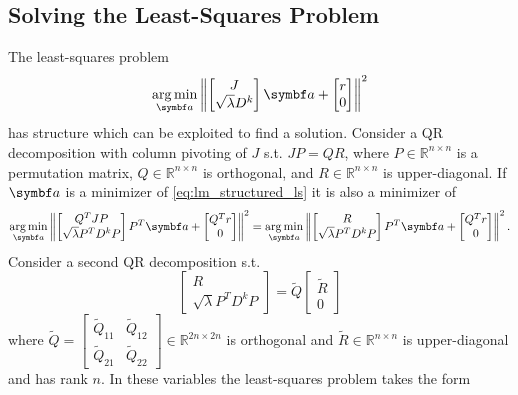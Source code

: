 \subsection{Solving the Least-Squares Problem}
The least-squares problem
\begin{equation}
  \label{eq:lm_structured_ls}
  \argmin_{\a} \left\| \begin{bmatrix} J \\ \sqrt{\lambda} D^k \end{bmatrix} \a + \begin{bmatrix} r \\ 0 \end{bmatrix} \right\|^2
\end{equation}
has structure which can be exploited to find a solution. Consider a QR decomposition with column pivoting of $J$ s.t. $J P = Q R$, where $P \in \mathbb{R}^{n \times n}$ is a permutation matrix, $Q \in \mathbb{R}^{n \times n}$ is orthogonal, and $R \in \mathbb{R}^{n \times n}$ is upper-diagonal. If $\a$ is a minimizer of \eqref{eq:lm_structured_ls} it is also a minimizer of
\begin{equation}
  \label{eq:lm_structured_ls}
  \argmin_{\a} \left\| \begin{bmatrix} Q^{T} J P \\ \sqrt{\lambda} P^{T} D^k P \end{bmatrix} P^{T} \a + \begin{bmatrix} Q^{T} r \\ 0 \end{bmatrix} \right\|^2 =     \argmin_{\a} \left\| \begin{bmatrix} R \\ \sqrt{\lambda} P^{T} D^k P \end{bmatrix} P^{T} \a + \begin{bmatrix} Q^{T} r \\ 0 \end{bmatrix} \right\|^2.
\end{equation}
Consider a second QR decomposition s.t.
\begin{equation}
  \begin{bmatrix}
    R \\ \sqrt{\lambda} P^{T} D^{k} P
  \end{bmatrix} = \tilde Q \begin{bmatrix} \tilde R \\ 0 \end{bmatrix}
\end{equation}
where $\tilde Q = \begin{bmatrix} \tilde Q_{11} & \tilde Q_{12} \\ \tilde Q_{21} & \tilde Q_{22} \end{bmatrix} \in \mathbb{R}^{2n \times 2n}$ is orthogonal and $\tilde R \in \mathbb{R}^{n \times n}$ is upper-diagonal and has rank $n$. In these variables the least-squares problem takes the form
